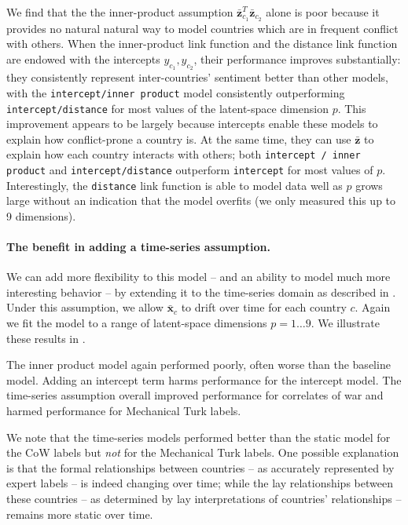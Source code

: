 We find that the the inner-product assumption $\bm \bar z_{c_1}^T \bm \bar
z_{c_2}$ alone is poor because it provides no natural natural way to
model countries which are in frequent conflict with others.
When the inner-product link function and the distance link function
are endowed with the intercepts $y_{c_1}, y_{c_2}$, their performance
improves substantially: they consistently represent inter-countries'
sentiment better than other models, with the
\verb!intercept/inner product!  model consistently outperforming
\verb!intercept/distance! for most values of the latent-space
dimension $p$. This improvement appears to be largely because
intercepts enable these models to explain how conflict-prone a country
is. At the same time, they can use $\bm \bar z$ to explain how each
country interacts with others; both \verb!intercept / inner product!
and \verb!intercept/distance! outperform \verb!intercept! for most
values of $p$.  Interestingly, the \verb!distance! link function is
able to model data well as $p$ grows large without an indication that
the model overfits (we only measured this up to 9 dimensions).

\paragraph{The benefit in adding a time-series assumption.}
We can add more flexibility to this model -- and an ability to model
much more interesting behavior -- by extending it to the time-series
domain as described in .  Under this
assumption, we allow $\bm \bar x_c$ to drift over time for each
country $c$.  Again we fit the model to a range of latent-space
dimensions $p = 1 \ldots 9$. We illustrate these results in
.

The inner product model again performed poorly, often worse than the
baseline model.  Adding an intercept term harms performance for the
intercept model.  The time-series assumption overall improved
performance for correlates of war and harmed performance for
Mechanical Turk labels.

We note that the time-series models performed better than the static
model for the CoW labels but \emph{not} for the Mechanical Turk
labels.  One possible explanation is that the formal relationships
between countries -- as accurately represented by expert labels -- is
indeed changing over time; while the lay relationships between these
countries -- as determined by lay interpretations of countries'
relationships -- remains more static over time.


